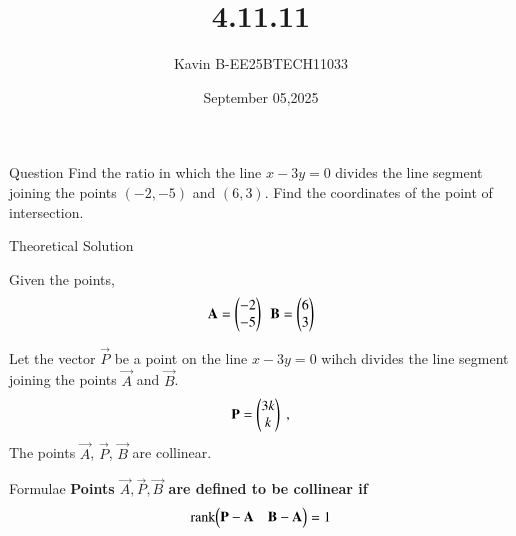 \documentclass{beamer}
\begin{document}
\title 
{4.11.11}
\date{September 05,2025}


\author 
{Kavin B-EE25BTECH11033}






\frame{\titlepage}
\begin{frame}{Question}
Find the ratio in which the line $x - 3y = 0$ divides the line segment joining the points $(-2, -5)$ and $(6, 3)$. Find the coordinates of the point of intersection.\\
\end{frame}



\begin{frame}{Theoretical Solution}

Given the points,
\begin{align}
    \vec{A}=\begin{myvec}{-2\\-5}\end{myvec}\ \ 
    \vec{B}=\begin{myvec}{6\\3}\end{myvec}
\end{align}
\bigskip

Let the vector $\vec{P}$ be a point on the line $x - 3y = 0$ wihch divides the line segment joining the points $\vec{A}$ and $\vec{B}$.
\begin{align}
    \vec{P}=\begin{myvec}{3k\\k}\end{myvec} \;, 
\end{align}
The points $\vec{A}$, $\vec{P}$, $\vec{B}$ are collinear.\\
\end{frame}

\begin{frame}{Formulae}
\textbf{Points $\vec{A}, \vec{P}, \vec{B}$ are defined to be collinear if}
\begin{align}
		\text{rank}{\ensuremath{\begin{pmatrix}\mathbf{P}-\mathbf{A}& \mathbf{B}-\mathbf{A}\end{pmatrix}}} = 1
\end{align}
\end{frame}
\end{document}
